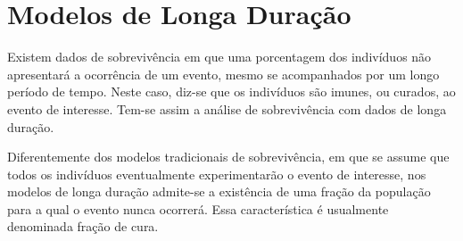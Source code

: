 


\section{Modelos de Longa Duração}

Existem dados de sobrevivência em que uma porcentagem dos indivíduos não apresentará a ocorrência de um evento,
mesmo se acompanhados por um longo período de tempo. Neste caso, diz-se que os indivíduos são imunes, ou curados,
ao evento de interesse. Tem-se assim a análise de sobrevivência com dados de longa duração.

Diferentemente dos modelos tradicionais de sobrevivência, em que se assume que todos os indivíduos eventualmente
experimentarão o evento de interesse, nos modelos de longa duração admite-se a existência de uma fração da população
para a qual o evento nunca ocorrerá. Essa característica é usualmente denominada fração de cura.

